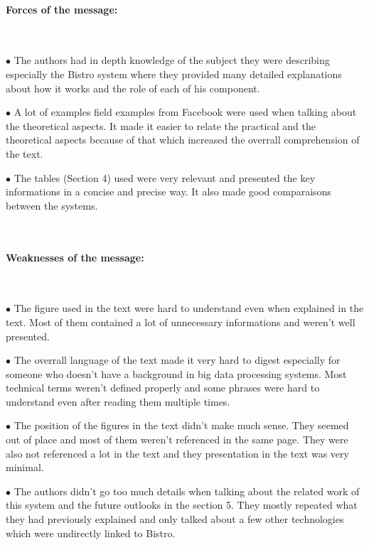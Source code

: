 \documentclass[11pt]{article}
\begin{document}
\paragraph{Forces of the message:}
~\newline
~\newline
\begin{minipage}[t]{1\textwidth}
    \begin{description}
        \item $\bullet$ The authors had in depth knowledge of the subject they were describing especially the Bistro system where they provided many detailed explanations about how it works and the role of each of his component.
        \item $\bullet$ A lot of examples field examples from Facebook were used when talking about the theoretical aspects. It made it easier to relate the practical and the theoretical aspects because of that which increased the overrall comprehension of the text.
        \item $\bullet$ The tables (Section 4) used were very relevant and presented the key informations in a concise and precise way. It also made good comparaisons between the systems.
    \end{description}
\end{minipage}
~\newline
\paragraph{Weaknesses of the message:}
~\newline
\hfill
~\newline
\begin{minipage}[t]{1\textwidth}
    \begin{description}
        \item $\bullet$ The figure used in the text were hard to understand even when explained in the text. Most of them contained a lot of unnecessary informations and weren't well presented.
        \item $\bullet$ The overrall language of the text made it very hard to digest especially for someone who doesn't have a background in big data processing systems. Most technical terms weren't defined properly and some phrases were hard to understand even after reading them multiple times.
        \item $\bullet$ The position of the figures in the text didn't make much sense. They seemed out of place and most of them weren't referenced in the same page. They were also not referenced a lot in the text and they presentation in the text was very minimal. 
        \item $\bullet$ The authors didn't go too much details when talking about the related work of this system and the future outlooks in the section 5. They mostly repeated what they had previously explained and only talked about a few other technologies which were undirectly linked to Bistro.
    \end{description}
\end{minipage}
\end{document}
